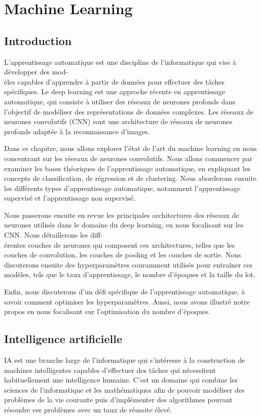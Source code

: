 \chapter{Machine Learning}
\section{Introduction}
L'apprentissage automatique est une discipline de l'informatique qui vise à développer des mod-\\èles capables d'apprendre à partir de données pour effectuer des tâches spécifiques. Le deep learning est une approche récente en apprentissage automatique, qui consiste à utiliser des réseaux de neurones profonds dans l'objectif de modéliser des représentations de données complexes. Les réseaux de neurones convolutifs (CNN) sont une architecture de réseaux de neurones profonds adaptée à la reconnaissance d'images.

Dans ce chapitre, nous allons explorer l'état de l'art du machine learning en nous concentrant sur les réseaux de neurones convolutifs. Nous allons commencer par examiner les bases théoriques de l'apprentissage automatique, en expliquant les concepts de classification, de régression et de clustering. Nous aborderons ensuite les différents types d'apprentissage automatique, notamment l'apprentissage supervisé et l'apprentissage non supervisé.

Nous passerons ensuite en revue les principales architectures des réseaux de neurones utilisés dans le domaine du deep learning, en nous focalisant sur les CNN. Nous détaillerons les diff-\\érentes couches de neurones qui composent ces architectures, telles que les couches de convolution, les couches de pooling et les couches de sortie. Nous discuterons ensuite des hyperparamètres couramment utilisés pour entraîner ces modèles, tels que le taux d'apprentissage, le nombre d'époques et la taille du lot. 

Enfin, nous discuterons d'un défi spécifique de l'apprentissage automatique, à savoir comment optimiser les hyperparamètres. Aussi, nous avons illustré notre propos en nous focalisant sur l'optimisation du nombre d'époques.

\section{Intelligence artificielle}
IA est une branche large de l'informatique qui s'intéresse à la construction de machines intelligentes capables d'effectuer des tâches qui nécessitent habituellement une intelligence humaine. C'est un domaine qui combine les sciences de l'informatique et les mathématiques afin de pouvoir modéliser des problèmes de la vie courante puis d’implémenter des algorithmes pouvant résoudre ces problèmes avec un taux de réussite élevé.


